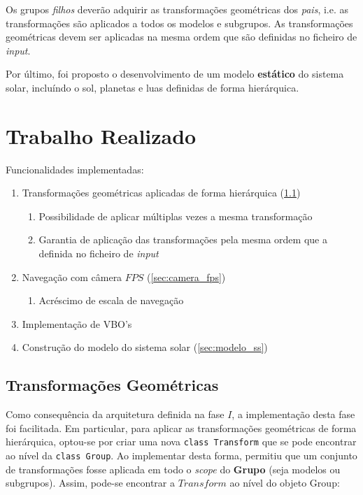 \documentclass[runningheads]{llncs}
\begin{document}
Os grupos \textit{filhos} deverão adquirir as transformações geométricas dos \textit{pais},
i.e. as transformações são aplicados a todos os modelos e subgrupos.
As transformações geométricas devem ser aplicadas na mesma ordem que são definidas no ficheiro de \textit{input}.

Por último, foi proposto o desenvolvimento de um modelo \textbf{estático} do sistema solar, incluíndo o sol,
planetas e luas definidas de forma hierárquica.

\section{Trabalho Realizado}
Funcionalidades implementadas:
\begin{enumerate}
    \item Transformações geométricas aplicadas de forma hierárquica (\ref{sec:transf_geometricas})
          \begin{enumerate}
              \item Possibilidade de aplicar múltiplas vezes a mesma transformação
              \item Garantia de aplicação das transformações pela mesma ordem que a definida no ficheiro de \textit{input}
          \end{enumerate}
    \item Navegação com câmera $FPS$ (\ref{sec:camera_fps})
          \begin{enumerate}
              \item Acréscimo de escala de navegação
          \end{enumerate}
    \item Implementação de VBO's
    \item Construção do modelo do sistema solar (\ref{sec:modelo_ss})
\end{enumerate}

\subsection{Transformações Geométricas} \label{sec:transf_geometricas}
Como consequência da arquitetura definida na fase $I$, a implementação desta fase foi facilitada.
Em particular, para aplicar as transformações geométricas de forma hierárquica, optou-se
por criar uma nova \texttt{class Transform} que se pode encontrar ao nível da
\texttt{class Group}.
Ao implementar desta forma, permitiu que um conjunto de transformações fosse aplicada em todo
o \textit{scope} do \textbf{Grupo} (seja modelos ou subgrupos).
Assim, pode-se encontrar a $Transform$ ao nível do objeto Group:
\end{document}
